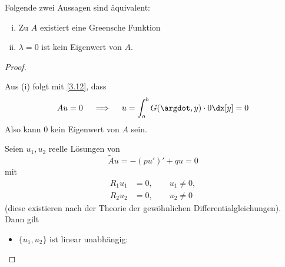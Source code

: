 \begin{st} \label{3.14}
	Folgende zwei Aussagen sind äquivalent:
	\begin{enumerate}[(i)]
		\item
			Zu $A$ existiert eine Greensche Funktion
		\item
			$\lambda = 0$ ist kein Eigenwert von $A$.
	\end{enumerate}
	\begin{proof}
		\begin{seg}[(i)$\implies$(ii)]
			Aus (i) folgt mit \ref{3.12}, dass
			\[
				Au = 0 \quad\implies\quad u = \int_a^b G(\argdot,y) \cdot 0 \dx[y] = 0
			\]
			Also kann $0$ kein Eigenwert von $A$ sein.
		\end{seg}
		\begin{seg}[(ii)$\implies$(i)]
			Seien $u_1,u_2$ reelle Lösungen von 
			\[
				\tilde A u = -(pu')' + qu = 0
			\]
			mit
			\begin{align*}
				R_1u_1 &= 0, \qquad u_1 \neq 0, \\
				R_2u_2 &= 0, \qquad u_2 \neq 0
			\end{align*}
			(diese existieren nach der Theorie der gewöhnlichen Differentialgleichungen).
			Dann gilt
			\begin{itemize}
				\item
					$\{u_1,u_2\}$ ist linear unabhängig:


\end{itemize}
\end{seg}
\end{proof}
\end{st}
